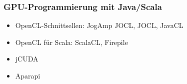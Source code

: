 \begin{frame}
    \frametitle{GPU-Programmierung mit Java/Scala}
    \begin{itemize}
        \item OpenCL-Schnittsellen: JogAmp JOCL, JOCL, JavaCL
        \item OpenCL für Scala: ScalaCL, Firepile %
        \item jCUDA
        \item Aparapi

\end{itemize}
\end{frame}
